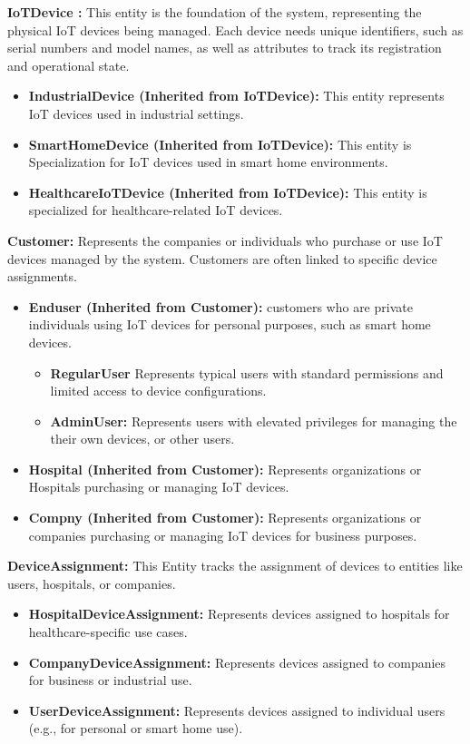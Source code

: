 \documentclass{article}
\begin{document}
\textbf{ IoTDevice :}
This entity is the foundation of the system, representing the physical IoT devices being managed. Each device needs unique identifiers, such as serial numbers and model names, as well as attributes to track its registration and operational state.




\begin{itemize}
    \item \textbf{IndustrialDevice (Inherited from IoTDevice):}
    This entity represents IoT devices used in industrial settings. 
    \item \textbf{SmartHomeDevice (Inherited from IoTDevice):}
    This entity is Specialization for IoT devices used in smart home environments.
    \item \textbf{HealthcareIoTDevice (Inherited from IoTDevice):} This entity is specialized for healthcare-related IoT devices.
\end{itemize}


\textbf{Customer:}
Represents the companies or individuals who purchase or use IoT devices managed by the system. Customers are often linked to specific device assignments.

\begin{itemize}
    \item \textbf{Enduser (Inherited from Customer):} customers who are private individuals using IoT devices for personal purposes, such as smart home devices.
        \begin{itemize}
            \item \textbf{RegularUser} Represents typical users with standard permissions and limited access to device configurations.
            \item \textbf{AdminUser:} Represents users with elevated privileges for managing the their own devices, or other users.
        \end{itemize}

    \item \textbf{Hospital (Inherited from Customer):} Represents organizations or Hospitals purchasing or managing IoT devices.
    \item \textbf{Compny (Inherited from Customer):} Represents organizations or companies purchasing or managing IoT devices for business purposes.
\end{itemize}

\textbf{DeviceAssignment:}
This Entity tracks the assignment of devices to entities like users, hospitals, or companies.
\begin{itemize}
    \item \textbf{HospitalDeviceAssignment:} Represents devices assigned to hospitals for healthcare-specific use cases.
    \item \textbf{CompanyDeviceAssignment:} Represents devices assigned to companies for business or industrial use.
    \item \textbf{UserDeviceAssignment:} Represents devices assigned to individual users (e.g., for personal or smart home use).
\end{itemize}
\end{document}
